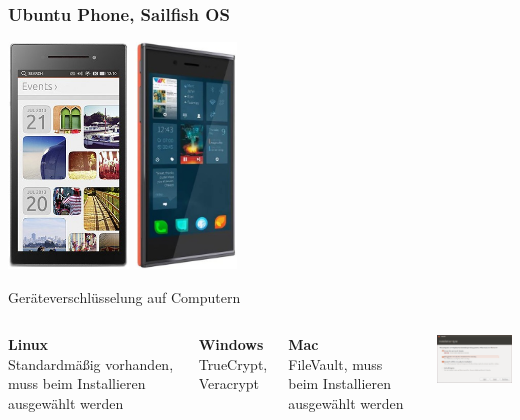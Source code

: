 \documentclass[12pt, xcolor={svgnames,table}]{beamer}
\begin{document}
\begin{frame}
  \frametitle{Ubuntu Phone, Sailfish OS}
    \begin{center}
      \includegraphics[height=6cm]{img/ubuntuphone.jpg}
      \hspace{0.5cm}
      \includegraphics[height=6cm]{img/sailfishos.jpg}
    \end{center}
\end{frame}

\begin{frame}{Geräteverschlüsselung auf Computern}
  \begin{columns}
    \column{4cm}
    \footnotesize

    \textbf{Linux}\\
    Standardmäßig vorhanden, muss beim Installieren ausgewählt werden
    \vspace{0.5cm}

    \textbf{Windows}\\
    TrueCrypt, Veracrypt
    \vspace{0.5cm}

    \textbf{Mac}\\
    FileVault, muss beim Installieren ausgewählt werden
    \vspace{0.5cm}
    \column{5cm}

    \begin{center}
      \includegraphics[width=5cm]{img/encryption-ubuntu.png}
    \par\end{center}
  \end{columns}
\end{frame}
\end{document}
